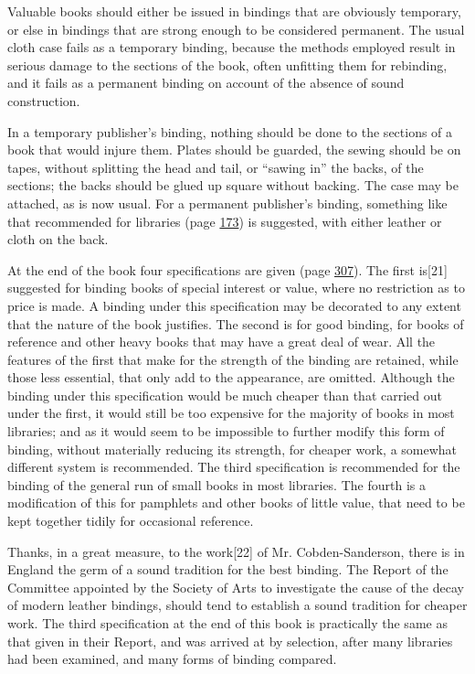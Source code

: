 \documentclass[
]{article}
\begin{document}
Valuable books should either be issued in bindings that are obviously
temporary, or else in bindings that are strong enough to be considered
permanent. The usual cloth case fails as a temporary binding, because
the methods employed result in serious damage to the sections of the
book, often unfitting them for rebinding, and it fails as a permanent
binding on account of the absence of sound construction.

In a temporary publisher's binding, nothing should be done to the
sections of a book that would injure them. Plates should be guarded, the
sewing should be on tapes, without splitting the head and tail, or
``sawing in'' the backs, of the sections; the backs should be glued up
square without backing. The case may be attached, as is now usual. For a
permanent publisher's binding, something like that recommended for
libraries (page \protect\hyperlink{Page_173}{173}) is suggested, with
either leather or cloth on the back.

At the end of the book four specifications are given (page
\protect\hyperlink{Page_307}{307}). The first
is{\protect\hypertarget{Page_21}{}{{[}21{]}}} suggested for binding
books of special interest or value, where no restriction as to price is
made. A binding under this specification may be decorated to any extent
that the nature of the book justifies. The second is for good binding,
for books of reference and other heavy books that may have a great deal
of wear. All the features of the first that make for the strength of the
binding are retained, while those less essential, that only add to the
appearance, are omitted. Although the binding under this specification
would be much cheaper than that carried out under the first, it would
still be too expensive for the majority of books in most libraries; and
as it would seem to be impossible to further modify this form of
binding, without materially reducing its strength, for cheaper work, a
somewhat different system is recommended. The third specification is
recommended for the binding of the general run of small books in most
libraries. The fourth is a modification of this for pamphlets and other
books of little value, that need to be kept together tidily for
occasional reference.

Thanks, in a great measure, to the
work{\protect\hypertarget{Page_22}{}{{[}22{]}}} of Mr. Cobden-Sanderson,
there is in England the germ of a sound tradition for the best binding.
The Report of the Committee appointed by the Society of Arts to
investigate the cause of the decay of modern leather bindings, should
tend to establish a sound tradition for cheaper work. The third
specification at the end of this book is practically the same as that
given in their Report, and was arrived at by selection, after many
libraries had been examined, and many forms of binding compared.
\end{document}
